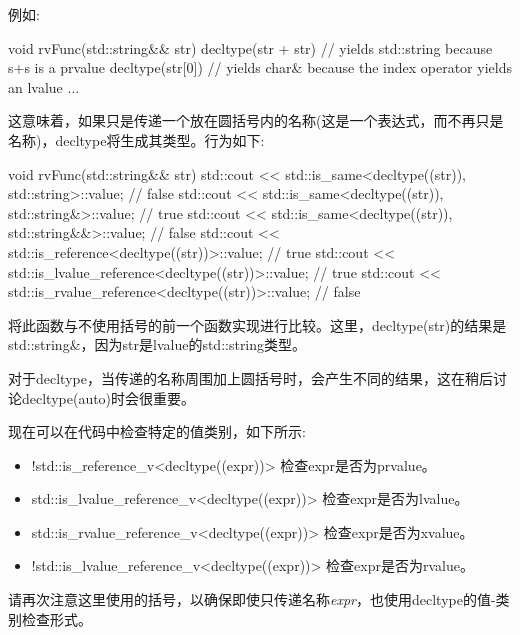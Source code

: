 例如:\par

\begin{codebox}[cpp]
void rvFunc(std::string&& str)
{
  decltype(str + str) // yields std::string because s+s is a prvalue
  decltype(str[0]) // yields char& because the index operator yields an lvalue
  ...
}
\end{codebox}

这意味着，如果只是传递一个放在圆括号内的名称(这是一个表达式，而不再只是名称)，decltype将生成其类型。行为如下:\par

\begin{codebox}[cpp]
void rvFunc(std::string&& str)
{
  std::cout << std::is_same<decltype((str)), std::string>::value; // false
  std::cout << std::is_same<decltype((str)), std::string&>::value; // true
  std::cout << std::is_same<decltype((str)), std::string&&>::value; // false
  std::cout << std::is_reference<decltype((str))>::value; // true
  std::cout << std::is_lvalue_reference<decltype((str))>::value; // true
  std::cout << std::is_rvalue_reference<decltype((str))>::value; // false
}
\end{codebox}

将此函数与不使用括号的前一个函数实现进行比较。这里，decltype(str)的结果是std::string\&，因为str是lvalue的std::string类型。\par

对于decltype，当传递的名称周围加上圆括号时，会产生不同的结果，这在稍后讨论decltype(auto)时会很重要。\par


现在可以在代码中检查特定的值类别，如下所示:\par

\begin{itemize}
  \item !std::is\_reference\_v<decltype((expr))>
  检查expr是否为prvalue。
  \item std::is\_lvalue\_reference\_v<decltype((expr))>
  检查expr是否为lvalue。
  \item std::is\_rvalue\_reference\_v<decltype((expr))>
  检查expr是否为xvalue。
  \item !std::is\_lvalue\_reference\_v<decltype((expr))>
  检查expr是否为rvalue。
\end{itemize}

请再次注意这里使用的括号，以确保即使只传递名称\textit{expr}，也使用decltype的值-类别检查形式。\par

